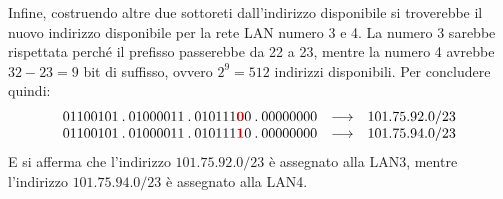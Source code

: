 \documentclass[a4paper]{article}
\newcommand{\binaryaddresspointed}[4]{#1\:.\:#2\:.\:#3\:.\:#4}
\begin{document}
	\noindent
	Infine, costruendo altre due sottoreti dall’indirizzo disponibile si troverebbe il nuovo indirizzo disponibile per la rete LAN numero 3 e 4. La numero 3 sarebbe rispettata perché il prefisso passerebbe da 22 a 23, mentre la numero 4 avrebbe $32-23=9$ bit di suffisso, ovvero $2^{9}=512$ indirizzi disponibili.\newline
	Per concludere quindi:
	\begin{equation*}
		\begin{array}{lll}
			\binaryaddresspointed{01100101}{01000011}{010111\textcolor{Red3}{\boldsymbol{0}}0}{00000000} & \longrightarrow & 101.75.92.0/23 \\
			\binaryaddresspointed{01100101}{01000011}{010111\textcolor{Red3}{\boldsymbol{1}}0}{00000000} & \longrightarrow & 101.75.94.0/23
		\end{array}
	\end{equation*}
	E si afferma che l’indirizzo $101.75.92.0/23$ è assegnato alla LAN3, mentre l’indirizzo $101.75.94.0/23$ è assegnato alla LAN4.
\end{document}
